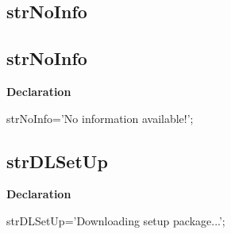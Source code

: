 \documentclass{report}
\newif\ifpdf
\begin{document}
\subsection*{\large{\textbf{strNoInfo}}\normalsize\hspace{1ex}\hrulefill}
\else
\subsection*{strNoInfo}
\fi
\label{trstrings-strNoInfo}
\begin{list}{}{
\setlength{\itemindent}{0cm}
\setlength{\listparindent}{0cm}
\setlength{\leftmargin}{\evensidemargin}
\addtolength{\leftmargin}{\tmplength}
\settowidth{\labelsep}{X}
\addtolength{\leftmargin}{\labelsep}
\setlength{\labelwidth}{\tmplength}
}
\item[\textbf{Declaration}\hfill]
\ifpdf
\begin{flushleft}
\fi
\begin{ttfamily}
strNoInfo='No information available!';\end{ttfamily}

\ifpdf
\end{flushleft}
\fi

\end{list}
\ifpdf
\subsection*{\large{\textbf{strDLSetUp}}\normalsize\hspace{1ex}\hrulefill}
\else
\subsection*{strDLSetUp}
\fi
\label{trstrings-strDLSetUp}
\begin{list}{}{
\setlength{\itemindent}{0cm}
\setlength{\listparindent}{0cm}
\setlength{\leftmargin}{\evensidemargin}
\addtolength{\leftmargin}{\tmplength}
\settowidth{\labelsep}{X}
\addtolength{\leftmargin}{\labelsep}
\setlength{\labelwidth}{\tmplength}
}
\item[\textbf{Declaration}\hfill]
\ifpdf
\begin{flushleft}
\fi
\begin{ttfamily}
strDLSetUp='Downloading setup package...';\end{ttfamily}

\ifpdf
\end{flushleft}
\fi

\end{list}
\ifpdf
\end{document}
